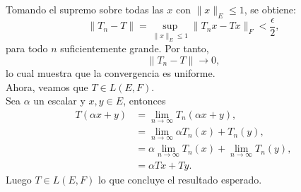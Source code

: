 \begin{homeworkProblem}
\begin{solution}
    Tomando el supremo sobre todas las $x$ con $\|x\|_E \leq 1$, se obtiene:
    $$\|T_n - T\| = \sup_{\|x\|_E \leq 1} \|T_n x - T x\|_F < \frac{\epsilon}{2},$$
    para todo $n$ suficientemente grande. Por tanto,
    $$\|T_n - T\| \to 0,$$
    lo cual muestra que la convergencia es uniforme.\\
    Ahora, veamos que $T\in L(E,F)$.\\
    Sea $\alpha$ un escalar y $x,y\in E$, entonces 
    \begin{align*}
      T(\alpha x+y)&=\lim_{n \to \infty}T_{n}(\alpha x+y),\\
      &=\lim_{n \to \infty}\alpha T_{n}(x)+T_{n}(y),\\
      &=\alpha \lim_{n \to \infty}T_{n}(x)+\lim_{n \to \infty}T_{n}(y),\\
      &=\alpha Tx + Ty.
    \end{align*}
    Luego $T\in L(E,F)$ lo que concluye el resultado esperado. 
  \end{solution}
\end{homeworkProblem}
